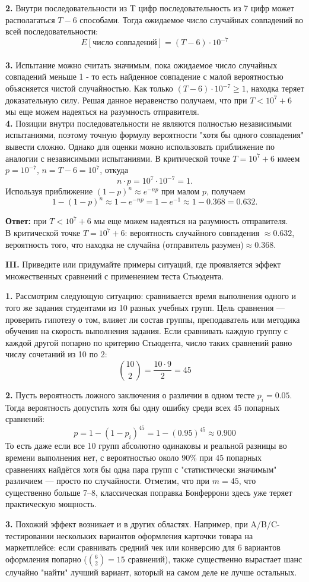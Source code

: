\documentclass{article}
\begin{document}
    \textbf{2.} Внутри последовательности из T цифр последовательность из 7 цифр может располагаться $T-6$ способами. Тогда ожидаемое число случайных совпадений во всей последовательности: \[E[\text{число совпадений}]=(T-6)\cdot10^{-7}\]\\

    \textbf{3. } Испытание можно считать значимым, пока ожидаемое число случайных совпадений меньше 1 - то есть найденное совпадение с малой вероятностью объясняется чистой случайностью. Как только $(T-6)\cdot10^{-7}\ge1$, находка теряет доказательную силу. Решая данное неравенство получаем, что при $T\lt10^7+6$ мы еще можем надеяться на разумность отправителя.\\

    \textbf{4.} Позиции внутри последовательности не являются полностью независимыми испытаниями, поэтому точную формулу вероятности "хотя бы одного совпадения" вывести сложно. Однако для оценки можно использовать приближение по аналогии с независимыми испытаниями. В критической точке $T=10^7+6$ имеем $p=10^{-7}$, $n=T-6=10^7$, откуда \[n\cdot p = 10^7\cdot10^{-7}=1.\]Используя приближение $(1-p)^n\approx e^{-np}$ при малом $p$, получаем \[1-(1-p)^n \approx 1-e^{-np}=1-e^{-1}\approx1-0.368=0.632.\]

    \textbf{Ответ:} при $T< 10^7+6$ мы еще можем надеяться на разумность отправителя.\\ В критической точке $T=10^7+6$: вероятность случайного совпадения $\approx0.632$, вероятность того, что находка не случайна (отправитель разумен)$\approx0.368$.
\begin{framed}
    \textbf{III.} Приведите или придумайте примеры ситуаций, где проявляется эффект
    множественных сравнений с применением теста Стьюдента.
\end{framed}
    \textbf{1.} Рассмотрим следующую ситуацию: сравнивается время выполнения одного и того же задания студентами из 10 разных учебных групп. Цель сравнения --- проверить гипотезу о том, влияет ли состав группы, преподаватель или методика обучения на скорость выполнения задания. Если сравнивать каждую группу с каждой другой попарно по критерию Стьюдента, число таких сравнений равно числу сочетаний из 10 по 2:\[\binom{10}{2}=\frac{10\cdot9}{2}=45\]

    \textbf{2.} Пусть вероятность ложного заключения о различии в одном тесте $p_i=0.05$. Тогда вероятность допустить хотя бы одну ошибку среди всех 45 попарных сравнений:\[ p=1-(1-p_i)^{45}=1-(0.95)^{45}\approx0.900\]
    То есть даже если все 10 групп абсолютно одинаковы и реальной разницы во времени выполнения нет, с вероятностью около 90\% при 45 попарных сравнениях найдётся хотя бы одна пара групп с "статистически значимым" различием --- просто по случайности. Отметим, что при $m=45$, что существенно больше 7--8, классическая поправка Бонферрони здесь уже теряет практическую мощность.

    \textbf{3.} Похожий эффект возникает и в других областях. Например, при A/B/C-тестировании нескольких вариантов оформления карточки товара на маркетплейсе: если сравнивать средний чек или конверсию для 6 вариантов оформления попарно ($\binom{6}{2}=15$ сравнений), также существенно вырастает шанс случайно "найти" лучший вариант, который на самом деле не лучше остальных.
\end{document}
